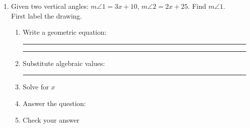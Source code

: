 \documentclass[12pt, oneside]{article}
\begin{document}
\begin{enumerate}
            \item Given two vertical angles: $m \angle 1 = 3x+10$, $m \angle 2 = 2x+25$. Find $m \angle 1$.\\
            First label the drawing.
            \begin{flushright}
            \end{flushright}
            \begin{enumerate}
              \item Write a geometric equation: \rule{4cm}{0.15mm} \hspace{1cm} \rule{4cm}{0.15mm}
              \vspace{.7cm}
              \item Substitute algebraic values: \rule{4cm}{0.15mm}
              \item Solve for $x$
              \vspace{2cm}
              \item Answer the question:
              \vspace{2cm}
              \item Check your answer
            \end{enumerate}

  \end{enumerate}

  \newpage
\end{document}

